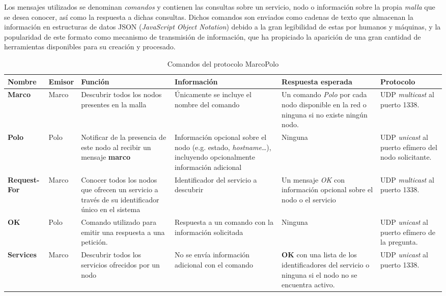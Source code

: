 Los mensajes utilizados se denominan \textit{comandos} y contienen las consultas sobre un servicio, nodo o información sobre la propia \textit{malla} que se desea conocer, así como la respuesta a dichas consultas. Dichos comandos son enviados como cadenas de texto que almacenan la información en estructuras de datos JSON (\textit{JavaScript Object Notation}) debido a la gran legibilidad de estas por humanos y máquinas, y la popularidad de este formato como mecanismo de transmisión de información, que ha propiciado la aparición de una gran cantidad de herramientas disponibles para su creación y procesado.

\begin{landscape}
\begin{table}[H]
\begin{tabular}{|l|p{1.3cm}|p{4.5cm}|p{5cm}|p{4.5cm}|p{3cm}|}
\hline
\textbf{Nombre} & \textbf{Emisor} & \textbf{Función} & \textbf{Información} & \textbf{Respuesta esperada} & \textbf{Protocolo}\\ \hline

\textbf{Marco} & Marco & Descubrir todos los nodos presentes en la malla & Únicamente se incluye el nombre del comando & Un comando \textit{Polo} por cada nodo disponible en la red o ninguna si no existe ningún nodo. & UDP \textit{multicast} al puerto 1338.\\ \hline

\textbf{Polo} & Polo & Notificar de la presencia de este nodo al recibir un mensaje \textbf{marco} & Información opcional sobre el nodo (e.g. estado, \textit{hostname}\dots), incluyendo opcionalmente información adicional  & Ninguna &  UDP \textit{unicast} al puerto efímero del nodo solicitante.\\ \hline

\textbf{Request-For} & Marco & Conocer todos los nodos que ofrecen un servicio a través de su identificador único en el sistema & Identificador del servicio a descubrir & Un mensaje \textit{OK} con información opcional sobre el nodo o el servicio & UDP \textit{multicast} al puerto 1338.\\ \hline

\textbf{OK} & Polo & Comando utilizado para emitir una respuesta a una petición. & Respuesta a un comando con la información solicitada & Ninguna & UDP \textit{unicast} al puerto efímero de la pregunta.\\ \hline

\textbf{Services} & Marco & Descubrir todos los servicios ofrecidos por un nodo & No se envía información adicional con el comando & \textbf{OK} con una lista de los identificadores del servicio o ninguna si el nodo no se encuentra activo. & UDP \textit{unicast} al puerto 1338.\\ \hline
\end{tabular}
\caption{Comandos del protocolo MarcoPolo}
\end{table}
\end{landscape}

